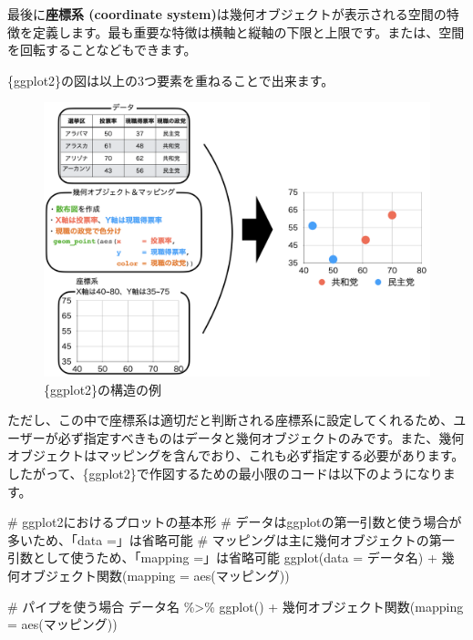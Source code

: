 \documentclass[
  a4paper,
  pandoc,
  ja=standard,
  jafont=haranoaji]{bxjsbook}
\newenvironment{Shaded}{\begin{snugshade}}{\end{snugshade}}
\newcommand{\AttributeTok}[1]{\textcolor[rgb]{0.00,0.48,0.65}{#1}}
\newcommand{\CommentTok}[1]{\textcolor[rgb]{0.37,0.37,0.37}{#1}}
\newcommand{\FunctionTok}[1]{\textcolor[rgb]{0.28,0.35,0.67}{#1}}
\newcommand{\NormalTok}[1]{\textcolor[rgb]{0.00,0.48,0.65}{#1}}
\newcommand{\SpecialCharTok}[1]{\textcolor[rgb]{0.37,0.37,0.37}{#1}}
\begin{document}
最後に\textbf{座標系 (coordinate
system)}は幾何オブジェクトが表示される空間の特徴を定義します。最も重要な特徴は横軸と縦軸の下限と上限です。または、空間を回転することなどもできます。

\{ggplot2\}の図は以上の3つ要素を重ねることで出来ます。

\begin{figure}

{\centering \includegraphics[width=1\textwidth,height=\textheight]{./Figs/Visualization1/Structure_Example.png}

}

\caption{\label{fig-visual1_structure_example}\{ggplot2\}の構造の例}

\end{figure}

ただし、この中で座標系は適切だと判断される座標系に設定してくれるため、ユーザーが必ず指定すべきものはデータと幾何オブジェクトのみです。また、幾何オブジェクトはマッピングを含んでおり、これも必ず指定する必要があります。したがって、\{ggplot2\}で作図するための最小限のコードは以下のようになります。

\begin{Shaded}
\begin{Highlighting}[numbers=left,,]
\CommentTok{\# ggplot2におけるプロットの基本形}
\CommentTok{\# データはggplotの第一引数と使う場合が多いため、「data =」は省略可能}
\CommentTok{\# マッピングは主に幾何オブジェクトの第一引数として使うため、「mapping =」は省略可能}
\FunctionTok{ggplot}\NormalTok{(}\AttributeTok{data =}\NormalTok{ データ名) }\SpecialCharTok{+}
\NormalTok{  幾何オブジェクト関数(}\AttributeTok{mapping =} \FunctionTok{aes}\NormalTok{(マッピング))}

\CommentTok{\# パイプを使う場合}
\NormalTok{データ名 }\SpecialCharTok{\%\textgreater{}\%}
  \FunctionTok{ggplot}\NormalTok{() }\SpecialCharTok{+}
\NormalTok{  幾何オブジェクト関数(}\AttributeTok{mapping =} \FunctionTok{aes}\NormalTok{(マッピング))}
\end{Highlighting}
\end{Shaded}
\end{document}
